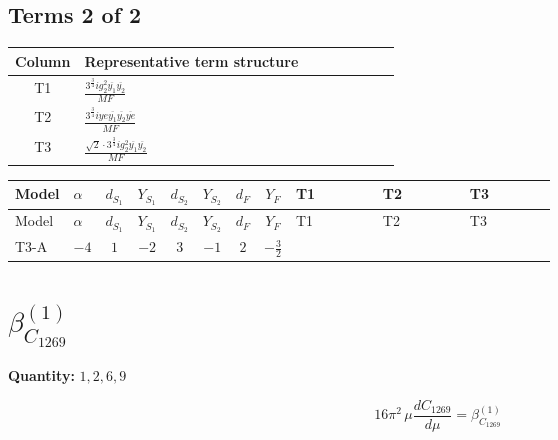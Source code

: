 \documentclass[8pt]{article}
\begin{document}
\begin{landscape}
\subsection*{Terms 2 of 2}
\begin{center}
\begin{tabular}{@{}c >{\raggedright\arraybackslash}p{0.82\linewidth}@{}}
\toprule
Column & Representative term structure \\
\midrule
T1 & \(\displaystyle \frac{3^{\frac{3}{4}} i g_{2}^{2} \overline{y_{1}} \overline{y_{2}}}{MF}\) \\
\midrule
T2 & \(\displaystyle \frac{3^{\frac{3}{4}} i ye \overline{y_{1}} \overline{y_{2}} \overline{ye}}{MF}\) \\
\midrule
T3 & \(\displaystyle \frac{\sqrt{2} \cdot 3^{\frac{3}{4}} i g_{2}^{2} \overline{y_{1}} \overline{y_{2}}}{MF}\) \\
\midrule
\bottomrule
\end{tabular}
\end{center}
\smallskip
\tiny
\begin{longtable}{@{}llcccccc >{\raggedright\arraybackslash}p{0.21\linewidth} >{\raggedright\arraybackslash}p{0.21\linewidth} >{\raggedright\arraybackslash}p{0.21\linewidth}@{}}
\toprule
Model & $\alpha$ & $d_{S_1}$ & $Y_{S_1}$ & $d_{S_2}$ & $Y_{S_2}$ & $d_F$ & $Y_F$ & T1 & T2 & T3 \\
\midrule
\endfirsthead
\toprule
Model & $\alpha$ & $d_{S_1}$ & $Y_{S_1}$ & $d_{S_2}$ & $Y_{S_2}$ & $d_F$ & $Y_F$ & T1 & T2 & T3 \\
\midrule
\endhead
T3-A & $-4$ & $1$ & $-2$ & $3$ & $-1$ & $2$ & $-\frac{3}{2}$ & \scriptsize\adjustbox{max width=\linewidth}{$\begin{gathered} \frac{25 \cdot 3^{\frac{3}{4}} i g_{2}^{2} \overline{y_{1}} \overline{y_{2}}}{24 MF}\end{gathered}$} & \scriptsize\adjustbox{max width=\linewidth}{$\begin{gathered} - \frac{3^{\frac{3}{4}} i ye \overline{y_{1}} \overline{y_{2}} \overline{ye}}{12 MF}\end{gathered}$} & \scriptsize\adjustbox{max width=\linewidth}{$\begin{gathered} \frac{\sqrt{2} \cdot 3^{\frac{3}{4}} i g_{2}^{2} \overline{y_{1}} \overline{y_{2}}}{6 MF}\end{gathered}$} \\
\midrule
\bottomrule
\end{longtable}
\clearpage
\section*{$\beta_{C_{1269}}^{(1)}$}
\noindent\textbf{Quantity: }$\mathrm{1,2,6,9}$\par\smallskip
\[16\pi^2\,\mu\frac{d C_{1269}}{d\mu}=\beta_{C_{1269}}^{(1)}\]

\end{landscape}
\end{document}
